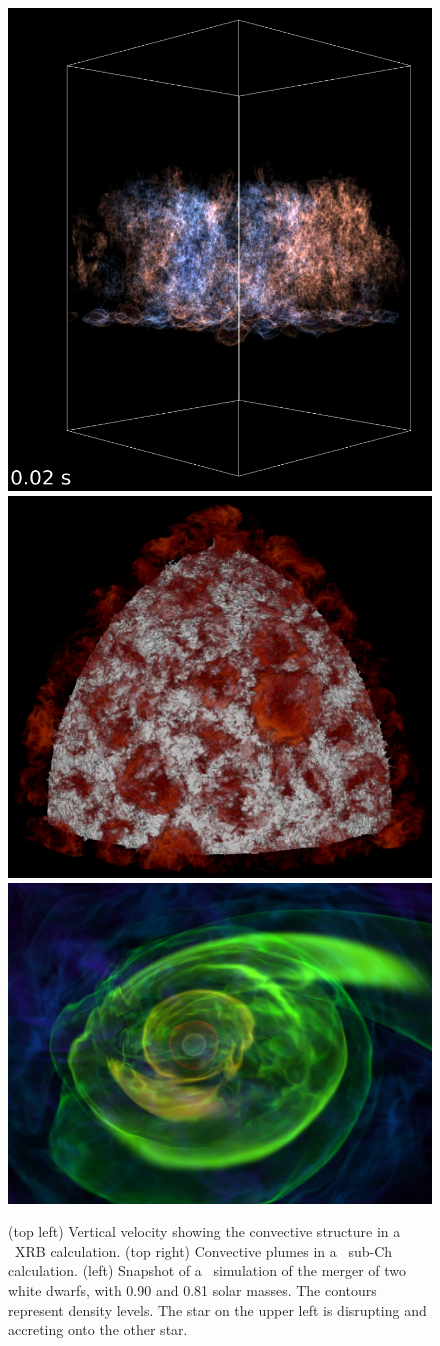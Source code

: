 \begin{figure}[t]
\centering
\includegraphics[width=0.28\linewidth]{xrb_compact}
\hspace{0.2em}
\includegraphics[width=0.28\linewidth]{ConvPlumes}
\hspace{0.2em}
\includegraphics[width=0.4\linewidth]{wdmerger_08030_new.png}
\caption{\label{fig:current-runs} (top left) Vertical velocity showing the
  convective structure in a \maestro\ XRB calculation.  (top right)
  Convective plumes in a \maestro\ sub-Ch calculation.  (left)
  Snapshot of a \castro\ simulation of the merger of two white dwarfs,
  with 0.90 and 0.81 solar masses. The contours represent density
  levels. The star on the upper left is disrupting and accreting onto
  the other star.}
\end{figure}


